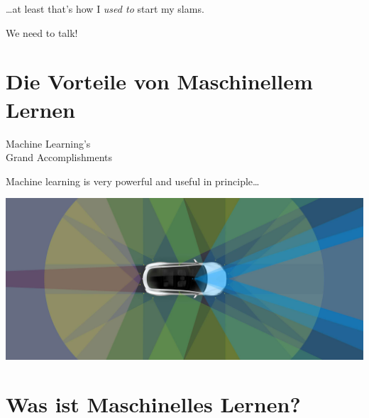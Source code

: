 \documentclass[aspectratio=169,x11names]{beamer}
\begin{document}

\begin{frame}

\begin{center}
\dots at least that's how I \emph{used to} start my slams.
\pause\bigskip

We need to talk!
\end{center}

\end{frame}

\section{Die Vorteile von Maschinellem Lernen}

\begin{frame}
\begin{center}
\huge
Machine Learning's\\ Grand Accomplishments
\end{center}
\end{frame}

\begin{frame}

\begin{center}
Machine learning is very powerful and useful in principle\dots
\end{center}

\begin{center}
\includegraphics[width=.9\textwidth]{images/autopilotnew.jpg} 
\end{center}
\end{frame}


\section{Was ist Maschinelles Lernen?}
\end{document}
